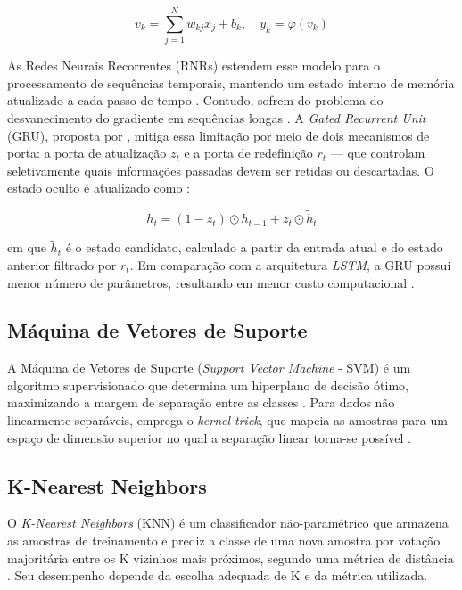 \begin{equation}
    v_{k} = \sum_{j=1}^{N}w_{kj}x_{j}+b_{k}, \quad y_{k} = \varphi(v_{k})
\end{equation}

As Redes Neurais Recorrentes (RNRs) estendem esse modelo para o processamento de sequências temporais, mantendo um estado interno de memória atualizado a cada passo de tempo \cite{Haykin2001}. Contudo, sofrem do problema do desvanecimento do gradiente em sequências longas \cite{Goodfellow2016}. A \textit{Gated Recurrent Unit} (GRU), proposta por , mitiga essa limitação por meio de dois mecanismos de porta: a porta de atualização $z_{t}$ e a porta de redefinição $r_{t}$ — que controlam seletivamente quais informações passadas devem ser retidas ou descartadas. O estado oculto é atualizado como \cite{Cho2014}:

\begin{equation}
    h_{t} = (1-z_{t}) \odot h_{t-1} + z_{t} \odot \tilde{h}_{t}
\end{equation}

em que $\tilde{h}_{t}$ é o estado candidato, calculado a partir da entrada atual e do estado anterior filtrado por $r_{t}$. Em comparação com a arquitetura \textit{LSTM}, a GRU possui menor número de parâmetros, resultando em menor custo computacional \cite{Goodfellow2016}.

\subsection{Máquina de Vetores de Suporte}
A Máquina de Vetores de Suporte (\textit{Support Vector Machine} - SVM) é um algoritmo supervisionado que determina um hiperplano de decisão ótimo, maximizando a margem de separação entre as classes \cite{Bishop2006}. Para dados não linearmente separáveis, emprega o \textit{kernel trick}, que mapeia as amostras para um espaço de dimensão superior no qual a separação linear torna-se possível \cite{Hastie2009}.

\subsection{K-Nearest Neighbors}
O \textit{K-Nearest Neighbors} (KNN) é um classificador não-paramétrico que armazena as amostras de treinamento e prediz a classe de uma nova amostra por votação majoritária entre os K vizinhos mais próximos, segundo uma métrica de distância \cite{Bishop2006, Hastie2009}. Seu desempenho depende da escolha adequada de K e da métrica utilizada.

